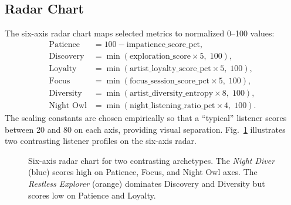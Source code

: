 \documentclass[conference]{IEEEtran}
\begin{document}
\subsection{Radar Chart}

The six-axis radar chart maps selected metrics to normalized 0–100 values:
\begin{align*}
  \text{Patience}   &= 100 - \text{impatience\_score\_pct}, \\
  \text{Discovery}  &= \min(\text{exploration\_score} \times 5,\; 100), \\
  \text{Loyalty}    &= \min(\text{artist\_loyalty\_score\_pct} \times 5,\; 100), \\
  \text{Focus}      &= \min(\text{focus\_session\_score\_pct} \times 5,\; 100), \\
  \text{Diversity}  &= \min(\text{artist\_diversity\_entropy} \times 8,\; 100), \\
  \text{Night Owl}  &= \min(\text{night\_listening\_ratio\_pct} \times 4,\; 100).
\end{align*}
The scaling constants are chosen empirically so that a ``typical'' listener
scores between 20 and 80 on each axis, providing visual separation.
Fig.~\ref{fig:radar} illustrates two contrasting listener profiles
on the six-axis radar.

\begin{figure}[ht]
\centering
{}
\caption{Six-axis radar chart for two contrasting archetypes. The
\textit{Night Diver} (blue) scores high on Patience, Focus, and Night
Owl axes. The \textit{Restless Explorer} (orange) dominates Discovery
and Diversity but scores low on Patience and Loyalty.}
\label{fig:radar}
\end{figure}
\end{document}

